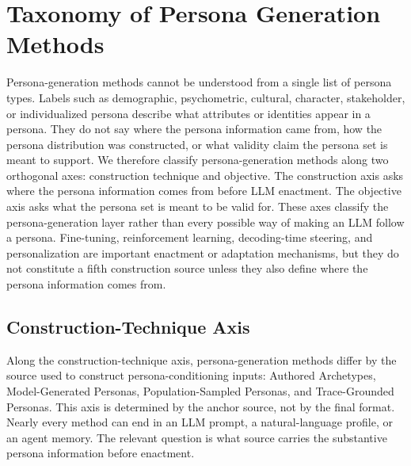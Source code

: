 \section{Taxonomy of Persona Generation Methods}
Persona-generation methods cannot be understood from a single list of persona
types. Labels such as demographic, psychometric, cultural, character,
stakeholder, or individualized persona describe what attributes or identities
appear in a persona. They do not say where the persona information came from,
how the persona distribution was constructed, or what validity claim the persona
set is meant to support. We therefore classify persona-generation methods along
two orthogonal axes: construction technique and objective. The construction
axis asks where the persona information comes from before LLM enactment. The
objective axis asks what the persona set is meant to be valid for. These axes
classify the persona-generation layer rather than every possible way of making
an LLM follow a persona. Fine-tuning, reinforcement learning, decoding-time
steering, and personalization are important enactment or adaptation mechanisms,
but they do not constitute a fifth construction source unless they also define
where the persona information comes from.

\subsection{Construction-Technique Axis}

Along the construction-technique axis, persona-generation methods differ by the
source used to construct persona-conditioning inputs: Authored Archetypes,
Model-Generated Personas, Population-Sampled Personas, and Trace-Grounded
Personas. This axis is determined by the anchor source, not by the final format.
Nearly every method can end in an LLM prompt, a natural-language profile, or an
agent memory. The relevant question is what source carries the substantive
persona information before enactment.

